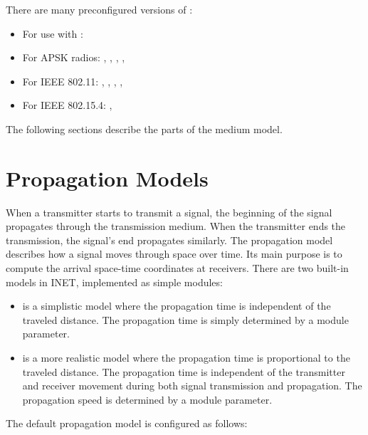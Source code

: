 There are many preconfigured versions of :

\begin{itemize}
  \item For use with : 
  \item For APSK radios: , ,
    , ,
  \item For IEEE 802.11: , ,
    , ,
  \item For IEEE 802.15.4: , 
\end{itemize}

The following sections describe the parts of the medium model.

\section{Propagation Models}

When a transmitter starts to transmit a signal, the beginning of the signal
propagates through the transmission medium. When the transmitter ends the
transmission, the signal's end propagates similarly. The propagation model
describes how a signal moves through space over time. Its main purpose is
to compute the arrival space-time coordinates at receivers. There are two
built-in models in INET, implemented as simple modules:

\begin{itemize}
        \item {} is a simplistic model where the propagation time is independent of the traveled distance. The propagation time is simply determined by a module parameter.
        \item {} is a more realistic model where the propagation time is proportional to the traveled distance. The propagation time is independent of the transmitter and receiver movement during both signal transmission and propagation. The propagation speed is determined by a module parameter.
\end{itemize}

The default propagation model is configured as follows:

